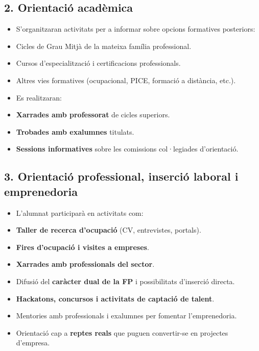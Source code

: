 \documentclass[
  paper=a4,
  ,captions=tableheading
]{scrartcl}
\providecommand{\tightlist}{%
  \setlength{\itemsep}{0pt}\setlength{\parskip}{0pt}}
\begin{document}
\hypertarget{orientaciuxf3-acaduxe8mica}{%
\subsection{2. Orientació acadèmica}\label{orientaciuxf3-acaduxe8mica}}

\begin{itemize}
\tightlist
\item
  S'organitzaran activitats per a informar sobre opcions formatives
  posteriors:
\item
  Cicles de Grau Mitjà de la mateixa família professional.
\item
  Cursos d'especialització i certificacions professionals.
\item
  Altres vies formatives (ocupacional, PICE, formació a distància,
  etc.).
\item
  Es realitzaran:
\item
  \textbf{Xarrades amb professorat} de cicles superiors.
\item
  \textbf{Trobades amb exalumnes} titulats.
\item
  \textbf{Sessions informatives} sobre les comissions col·legiades
  d'orientació.
\end{itemize}

\hypertarget{orientaciuxf3-professional-inserciuxf3-laboral-i-emprenedoria}{%
\subsection{3. Orientació professional, inserció laboral i
emprenedoria}\label{orientaciuxf3-professional-inserciuxf3-laboral-i-emprenedoria}}

\begin{itemize}
\tightlist
\item
  L'alumnat participarà en activitats com:
\item
  \textbf{Taller de recerca d'ocupació} (CV, entrevistes, portals).
\item
  \textbf{Fires d'ocupació i visites a empreses}.
\item
  \textbf{Xarrades amb professionals del sector}.
\item
  Difusió del \textbf{caràcter dual de la FP} i possibilitats d'inserció
  directa.
\item
  \textbf{Hackatons, concursos i activitats de captació de talent}.
\item
  Mentories amb professionals i exalumnes per fomentar l'emprenedoria.
\item
  Orientació cap a \textbf{reptes reals} que puguen convertir-se en
  projectes d'empresa.
\end{itemize}
\end{document}
